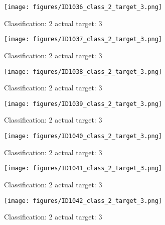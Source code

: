 \begin{figure}[h!]
\begin{center}
\texttt{[image: figures/ID1036\_class\_2\_target\_3.png]}
\end{center}
\caption{ Classification: 2 actual target: 3}
\label{fig:ID1036_class_2_target_3}
\end{figure}
\begin{figure}[h!]
\begin{center}
\texttt{[image: figures/ID1037\_class\_2\_target\_3.png]}
\end{center}
\caption{ Classification: 2 actual target: 3}
\label{fig:ID1037_class_2_target_3}
\end{figure}
\begin{figure}[h!]
\begin{center}
\texttt{[image: figures/ID1038\_class\_2\_target\_3.png]}
\end{center}
\caption{ Classification: 2 actual target: 3}
\label{fig:ID1038_class_2_target_3}
\end{figure}
\begin{figure}[h!]
\begin{center}
\texttt{[image: figures/ID1039\_class\_2\_target\_3.png]}
\end{center}
\caption{ Classification: 2 actual target: 3}
\label{fig:ID1039_class_2_target_3}
\end{figure}
\begin{figure}[h!]
\begin{center}
\texttt{[image: figures/ID1040\_class\_2\_target\_3.png]}
\end{center}
\caption{ Classification: 2 actual target: 3}
\label{fig:ID1040_class_2_target_3}
\end{figure}
\begin{figure}[h!]
\begin{center}
\texttt{[image: figures/ID1041\_class\_2\_target\_3.png]}
\end{center}
\caption{ Classification: 2 actual target: 3}
\label{fig:ID1041_class_2_target_3}
\end{figure}
\begin{figure}[h!]
\begin{center}
\texttt{[image: figures/ID1042\_class\_2\_target\_3.png]}
\end{center}
\caption{ Classification: 2 actual target: 3}
\label{fig:ID1042_class_2_target_3}
\end{figure}

